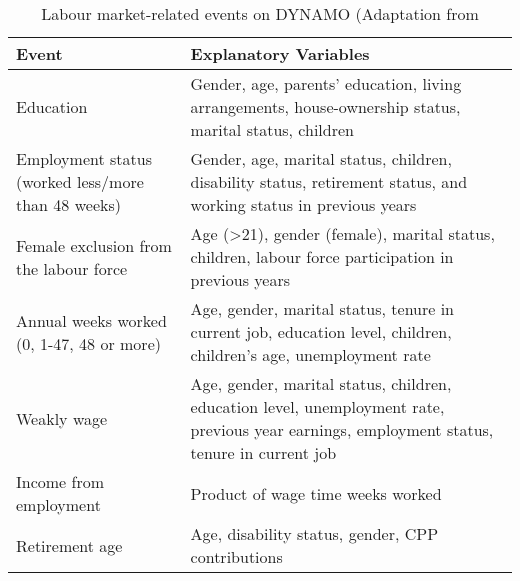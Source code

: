 \renewcommand{\arraystretch}{1.5}
\begin{table}[!h]
    \begin{tabular}{p{4cm}p{10cm}}
        \textbf{Event} & \textbf{Explanatory Variables} \\
        \hline
        \rowcolor{lightgray} Education & Gender, age, parents' education, living arrangements, house-ownership status, marital status, children \\

        Employment status (worked less/more than 48 weeks) & Gender, age, marital status, children, disability status, retirement status, and working status in previous years \\

        \rowcolor{lightgray} Female exclusion from the labour force & Age (>21), gender (female), marital status, children, labour force participation in previous years\\

        Annual weeks worked (0, 1-47, 48 or more) & Age, gender, marital status, tenure in current job, education level, children, children's age, unemployment rate\\ 

        \rowcolor{lightgray} Weakly wage & Age, gender, marital status, children, education level, unemployment rate, previous year earnings, employment status, tenure in current job \\

        Income from employment & Product of wage time weeks worked\\

        \rowcolor{lightgray} Retirement age & Age, disability status, gender, CPP contributions\\
        \hline
    \end{tabular}
    \caption{\label{table:dynacan} Labour market-related events on DYNAMO (Adaptation from \citet{Joseph1997}}
\end{table}

